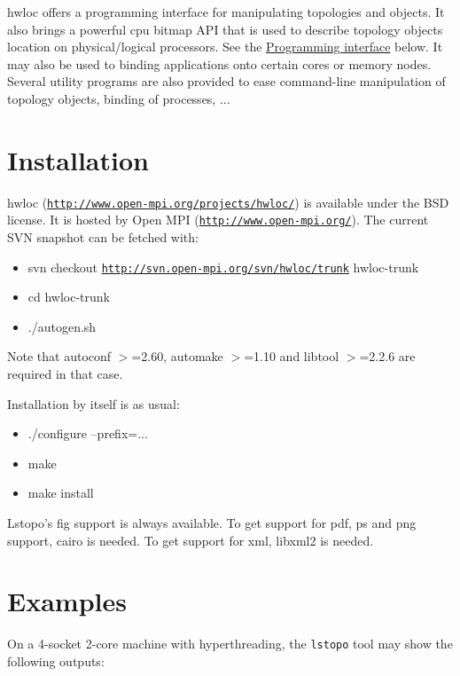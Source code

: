 hwloc offers a programming interface for manipulating topologies and objects. It also brings a powerful cpu bitmap API that is used to describe topology objects location on physical/logical processors. See the \hyperlink{index_interface}{Programming interface} below. It may also be used to binding applications onto certain cores or memory nodes. Several utility programs are also provided to ease command-line manipulation of topology objects, binding of processes, ...

 \hypertarget{index_installation}{}\section{Installation}\label{index_installation}
hwloc (\href{http://www.open-mpi.org/projects/hwloc/}{\tt http://www.open-mpi.org/projects/hwloc/}) is available under the BSD license. It is hosted by Open MPI (\href{http://www.open-mpi.org/}{\tt http://www.open-mpi.org/}). The current SVN snapshot can be fetched with:

\begin{itemize}
\item svn checkout \href{http://svn.open-mpi.org/svn/hwloc/trunk}{\tt http://svn.open-mpi.org/svn/hwloc/trunk} hwloc-trunk \item cd hwloc-trunk \item ./autogen.sh \end{itemize}


Note that autoconf $>$=2.60, automake $>$=1.10 and libtool $>$=2.2.6 are required in that case.

Installation by itself is as usual:

\begin{itemize}
\item ./configure --prefix=... \item make \item make install \end{itemize}


Lstopo's fig support is always available. To get support for pdf, ps and png support, cairo is needed. To get support for xml, libxml2 is needed.

 \hypertarget{index_examples}{}\section{Examples}\label{index_examples}
On a 4-socket 2-core machine with hyperthreading, the {\tt lstopo} tool may show the following outputs:

